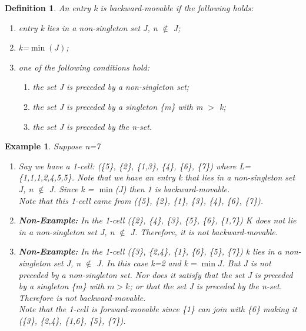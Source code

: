 \documentclass{amsart}
\newtheorem{Definition}[theorem]{Definition}
\newtheorem{Example}[theorem]{Example}
\newenvironment{definition}{\begin{Definition}\normalfont}{\end{Definition}}
\newenvironment{example}{\begin{Example}\normalfont}{\end{Example}}
\begin{document}
\begin{definition}
\cite{PANZU} An entry \textit{k} is \textit{backward-movable} if the following holds:
\begin{enumerate}
\item 
{entry \textit{k} lies in a non-singleton set J, \textit{n} $\not\in$ J;}
\item 
{\textit{k}=$\min(J)$;}

\item
{one of the following conditions hold:}
\begin{enumerate}
\item the set J is preceded by a non-singleton set;
\item the set J is preceded by a singleton \{\textit{m}\} with \textit{m} $>$ k;
\item the set J is preceded by the \textit{n}-set.
\end{enumerate}
\end{enumerate}
\end{definition}

\begin{example} Suppose \textit{n}=7
\begin{enumerate}
\item Say we have a 1-cell: (\{5\}, \{2\}, \{1,3\}, \{4\}, \{6\}, \{7\}) where L= \{1,1,1,2,4,5,5\}. Note that we have an entry \textit{k} that lies in a non-singleton set J, \textit{n} $\not\in$ J. Since \textit{k} = $\min$(J) then 1 is backward-movable. 
\\Note that this 1-cell came from (\{5\}, \{2\}, \{1\}, \{3\}, \{4\}, \{6\}, \{7\}).
\item \textbf{Non-Example:}
In the 1-cell (\{2\}, \{4\}, \{3\}, \{5\}, \{6\}, \{1,7\}) \textit{K} does not lie in a non-singleton set J, \textit{n} $\not\in$ J. Therefore, it is not backward-movable. 
\item \textbf{Non-Example:}
In the 1-cell (\{3\}, \{2,4\}, \{1\}, \{6\}, \{5\}, \{7\}) \textit{k} lies in a non-singleton set \textit{J}, \textit{n} $\not\in$ \textit{J}. In this case \textit{k}=2 and $k = \min{J}.$ But \textit{J} is not preceded by a non-singleton set. Nor does it satisfy that the set J is preceded by a singleton \{m\} with $m>k$; or that the set \textit{J} is preceded by the \textit{n}-set. Therefore  is not backward-movable.\\
Note that the 1-cell is forward-movable since \{1\} can join with \{6\} making it (\{3\}, \{2,4\}, \{1,6\}, \{5\}, \{7\}). 
\end{enumerate}
\end{example}
\end{document}
